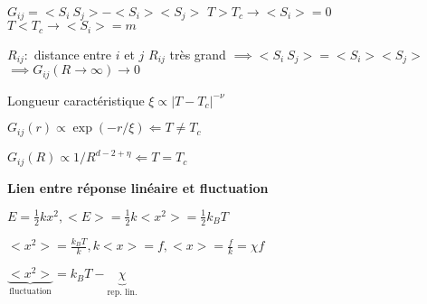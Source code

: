   \squishend
  \squishlist
   \item $G_{ij}=<S_i\ S_j>-<S_i><S_j>$
   \subitem $T>T_c \to <S_i>=0$
   \subitem $T<T_c \to <S_i>=m$
   \item $R_{ij} : $ distance entre $i$ et $j$
   \subitem $ R_{ij}$ très grand $\implies <S_i\ S_j>=<S_i><S_j>$
   \subitem $\implies G_{ij}(R\to \infty) \to 0$
   \item Longueur caractéristique $\xi\propto |T-T_c|^{-\nu}$
   \item $G_{ij}(r) \propto \exp{(-r/\xi)} \Leftarrow \boxed{T\neq T_c}$
   \item $G_{ij}(R) \propto 1/R^{d-2+\eta} \Leftarrow \boxed{T= T_c}$
   
  \squishend
  \squishlist
   \item[] \textbf{Lien entre réponse linéaire et fluctuation}
   \item $E=\frac{1}{2} k x^2, <E>=\frac{1}{2} k <x^2> = \frac{1}{2} k_B T$
   \item $<x^2>=\frac{k_BT}{k}, k<x>=f, <x>=\frac{f}{k}=\chi f$
   \item $\boxed{\underbrace{<x^2>}_{\text{fluctuation}}=k_BT-\underbrace{\chi}_{\text{rep. lin.}}}$
  \squishend